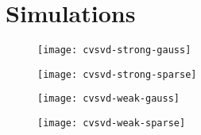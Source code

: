 \clearpage

\section{Simulations}

\begin{figure}[htb]
    \centering
    \begin{minipage}{0.49\textwidth}
        \begin{center}
            \texttt{[image: cvsvd-strong-gauss]}
        \end{center}
    \end{minipage}
    \begin{minipage}{0.49\textwidth}
        \begin{center}
            \texttt{[image: cvsvd-strong-sparse]}
        \end{center}
    \end{minipage}
    \caption{
    }
\end{figure}


\begin{figure}[tbh]
    \centering
    \begin{minipage}{0.49\textwidth}
        \begin{center}
            \texttt{[image: cvsvd-weak-gauss]}
        \end{center}
    \end{minipage}
    \begin{minipage}{0.49\textwidth}
        \begin{center}
            \texttt{[image: cvsvd-weak-sparse]}
        \end{center}
    \end{minipage}
    \caption{
    }
\end{figure}



\clearpage 

